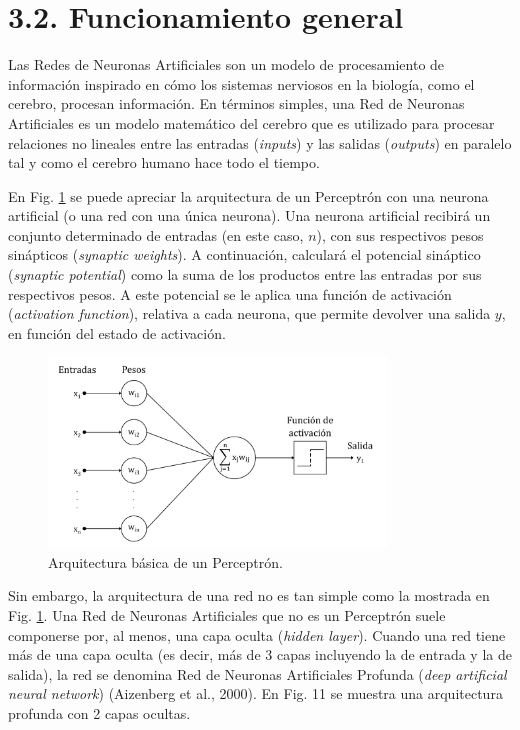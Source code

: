\documentclass[spanish,a4paper,12pt,twoside]{report}
\begin{document}
    \section*{\Large 3.2. Funcionamiento general}
    Las Redes de Neuronas Artificiales son un modelo de procesamiento de información inspirado en cómo los sistemas nerviosos en la biología, como el cerebro, procesan información. En términos simples, una Red de Neuronas Artificiales es un modelo matemático del cerebro que es utilizado para procesar relaciones no lineales entre las entradas (\emph{inputs}) y las salidas (\emph{outputs}) en paralelo tal y como el cerebro humano hace todo el tiempo. \par
    En Fig. \ref{fig:10} se puede apreciar la arquitectura de un Perceptrón con una neurona artificial (o una red con una única neurona). Una neurona artificial recibirá un conjunto determinado de entradas (en este caso, $n$), con sus respectivos pesos sinápticos (\emph{synaptic weights}). A continuación, calculará el potencial sináptico (\emph{synaptic potential}) como la suma de los productos entre las entradas por sus respectivos pesos. A este potencial se le aplica una función de activación (\emph{activation function}), relativa a cada neurona, que permite devolver una salida $y$, en función del estado de activación. \par
    \begin{figure}[H]
      \centering
      \includegraphics[width = 0.8\textwidth]{resources/Fig10.pdf}
      \caption{Arquitectura básica de un Perceptrón.}
      \label{fig:10}
    \end{figure} \par
    Sin embargo, la arquitectura de una red no es tan simple como la mostrada en Fig. \ref{fig:10}. Una Red de Neuronas Artificiales que no es un Perceptrón suele componerse por, al menos, una capa oculta (\emph{hidden layer}). Cuando una red tiene más de una capa oculta (es decir, más de 3 capas incluyendo la de entrada y la de salida), la red se denomina Red de Neuronas Artificiales Profunda (\emph{deep artificial neural network}) (Aizenberg et al., 2000). En Fig. 11 se muestra una arquitectura profunda con 2 capas ocultas. \par
\end{document}
